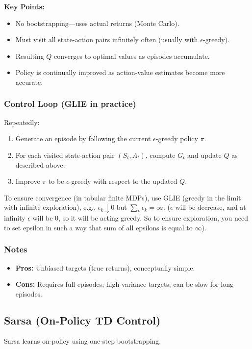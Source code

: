 \documentclass[12pt]{article}
\begin{document}
\textbf{Key Points:}
\begin{itemize}
    \item No bootstrapping—uses actual returns (Monte Carlo).
    \item Must visit all state-action pairs infinitely often (usually with $\epsilon$-greedy).
    \item Resulting $Q$ converges to optimal values as episodes accumulate.
    \item Policy is continually improved as action-value estimates become more accurate.
\end{itemize}


\subsubsection*{Control Loop (GLIE in practice)}
Repeatedly:
\begin{enumerate}
    \item Generate an episode by following the current $\epsilon$-greedy policy $\pi$.
    \item For each visited state-action pair $(S_t,A_t)$, compute $G_t$ and update $Q$ as described above.
    \item Improve $\pi$ to be $\epsilon$-greedy with respect to the updated $Q$.
\end{enumerate}
To ensure convergence (in tabular finite MDPs), use GLIE (greedy in the limit with infinite exploration), e.g., $\epsilon_k \downarrow 0$ but $\sum_k \epsilon_k = \infty$. ($\epsilon$ will be decrease, and at infinity $\epsilon$ will be 0, so it will be acting greedy. So to ensure exploration, you need to set epsilon in such a way that sum of all epsilons is equal to $\infty$).

\subsubsection*{Notes}
\begin{itemize}
    \item \textbf{Pros:} Unbiased targets (true returns), conceptually simple.
    \item \textbf{Cons:} Requires full episodes; high-variance targets; can be slow for long episodes.
\end{itemize}

\subsection{Sarsa (On-Policy TD Control)}
Sarsa learns on-policy using one-step bootstrapping.
\end{document}
